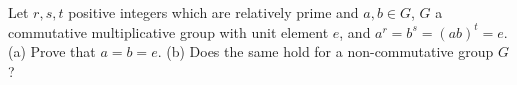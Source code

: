 Let $r,s,t$ positive integers which are relatively prime and $a,b \in G$, $G$ a commutative multiplicative group with unit element $e$, and $a^r=b^s=(ab)^t=e$.
(a) Prove that $a=b=e$.
(b) Does the same hold for a non-commutative group $G$?